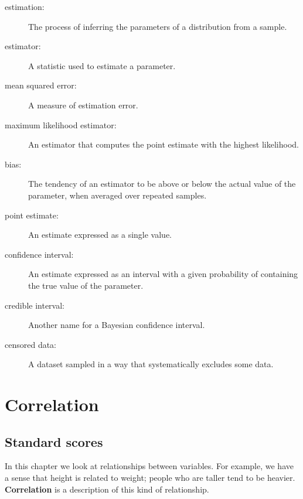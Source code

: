 \documentclass[12pt]{book}
\begin{document}
\begin{description}

\item[estimation:] The process of inferring the parameters of a distribution
from a sample.

\item[estimator:] A statistic used to estimate a parameter.

\item[mean squared error:] A measure of estimation error.

\item[maximum likelihood estimator:] An estimator that computes the
point estimate with the highest likelihood.

\item[bias:] The tendency of an estimator to be above or below the actual
value of the parameter, when averaged over repeated samples.

\item[point estimate:] An estimate expressed as a single value.

\item[confidence interval:] An estimate expressed as an interval with a
given probability of containing the true value of the parameter.

\item[credible interval:] Another name for a Bayesian confidence interval.

\item[censored data:] A dataset sampled in a way that systematically
excludes some data.

\end{description}


\chapter{Correlation}

\section{Standard scores}

In this chapter we look at relationships between variables.  For
example, we have a sense that height is related to weight; people who
are taller tend to be heavier.  {\bf Correlation} is a description of
this kind of relationship.
\end{document}
